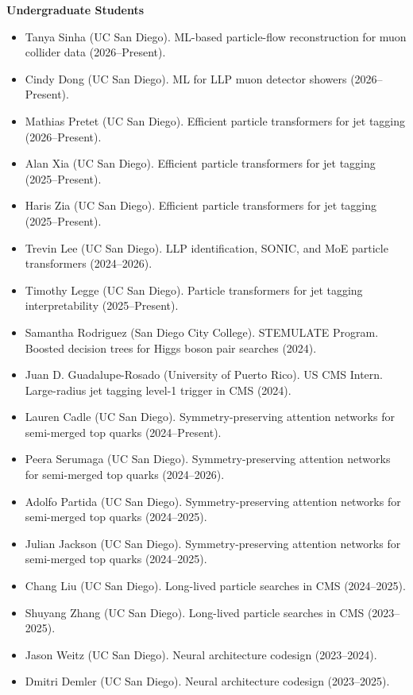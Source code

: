 \documentclass[11pt]{res}
\begin{document}
\begin{resume}
  \textbf{Undergraduate Students}
  \begin{itemize}
    \itemsep-0.3em
    \item Tanya Sinha (UC San Diego). ML-based particle-flow reconstruction for muon collider data (2026--Present).
    \item Cindy Dong (UC San Diego). ML for LLP muon detector showers (2026--Present).
    \item Mathias Pretet (UC San Diego). Efficient particle transformers for jet tagging (2026--Present).
    \item Alan Xia (UC San Diego). Efficient particle transformers for jet tagging (2025--Present).
    \item Haris Zia (UC San Diego). Efficient particle transformers for jet tagging (2025--Present).
    \item Trevin Lee (UC San Diego). LLP identification, SONIC, and MoE particle transformers (2024--2026).
    \item Timothy Legge (UC San Diego). Particle transformers for jet tagging interpretability (2025--Present).
    \item Samantha Rodriguez (San Diego City College). STEMULATE Program. Boosted decision trees for Higgs boson pair searches (2024).
    \item Juan D. Guadalupe-Rosado (University of Puerto Rico). US CMS Intern. Large-radius jet tagging level-1 trigger in CMS (2024).
    \item Lauren Cadle (UC San Diego). Symmetry-preserving attention networks for semi-merged top quarks (2024--Present).
    \item Peera Serumaga (UC San Diego).  Symmetry-preserving attention networks for semi-merged top quarks (2024--2026).
    \item Adolfo Partida (UC San Diego). Symmetry-preserving attention networks for semi-merged top quarks (2024--2025).
    \item Julian Jackson (UC San Diego). Symmetry-preserving attention networks for semi-merged top quarks (2024--2025).
    \item Chang Liu (UC San Diego). Long-lived particle searches in CMS (2024--2025).
    \item Shuyang Zhang (UC San Diego). Long-lived particle searches in CMS (2023--2025).
    \item Jason Weitz (UC San Diego). Neural architecture codesign (2023--2024).
    \item Dmitri Demler (UC San Diego). Neural architecture codesign (2023--2025).

\end{itemize}
\end{resume}
\end{document}
